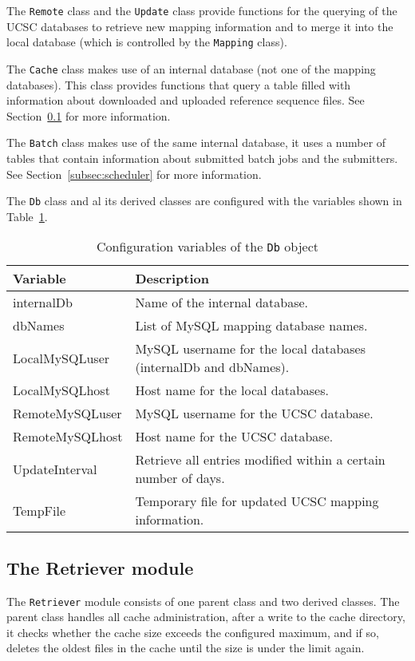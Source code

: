 \documentclass{article}
\begin{document}
The \texttt{Remote} class and the \texttt{Update} class provide functions for
the querying of the UCSC databases to retrieve new mapping information and to
merge it into the local database (which is controlled by the \texttt{Mapping}
class).

The \texttt{Cache} class makes use of an internal database (not one of the
mapping databases). This class provides functions that query a table filled
with information about downloaded and uploaded reference sequence files. See
Section~\ref{subsec:retriever} for more information.

The \texttt{Batch} class makes use of the same internal database, it uses a
number of tables that contain information about submitted batch jobs and the
submitters. See Section~\ref{subsec:scheduler} for more information.

The \texttt{Db} class and al its derived classes are configured with the
variables shown in Table~\ref{tab:dbconfig}.

\begin{table}[H]
\begin{center}
\begin{tabular}{l|p{8cm}}
Variable        & Description \\
\hline
internalDb      & Name of the internal database. \\
dbNames         & List of MySQL mapping database names. \\
LocalMySQLuser  & MySQL username for the local databases (internalDb and
                  dbNames). \\
LocalMySQLhost  & Host name for the local databases. \\
RemoteMySQLuser & MySQL username for the UCSC database. \\
RemoteMySQLhost & Host name for the UCSC database. \\
UpdateInterval  & Retrieve all entries modified within a certain number of
                  days. \\
TempFile        & Temporary file for updated UCSC mapping information.
\end{tabular}
\caption{Configuration variables of the \texttt{Db} object}
\label{tab:dbconfig}
\end{center}
\end{table}

\subsection{The Retriever module} \label{subsec:retriever}
The \texttt{Retriever} module consists of one parent class and two derived
classes. The parent class handles all cache administration, after a write to
the cache directory, it checks whether the cache size exceeds the configured
maximum, and if so, deletes the oldest files in the cache until the size is
under the limit again.
\end{document}
